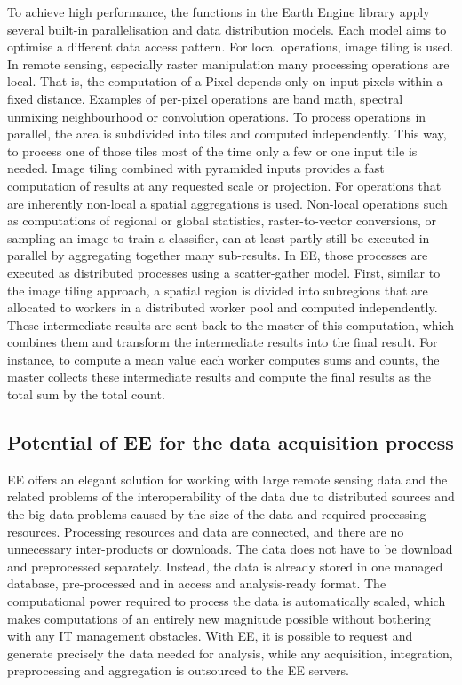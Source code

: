 To achieve high performance, the functions in the Earth Engine library apply several built-in parallelisation and data distribution models. Each model aims to optimise a different data access pattern.
For local operations, image tiling is used.
In remote sensing, especially raster manipulation many processing operations are local. That is, the computation of a Pixel depends only on input pixels within a fixed distance. Examples of per-pixel operations are band math, spectral unmixing neighbourhood or convolution operations. To process operations in parallel, the area is subdivided into tiles and computed independently. This way, to process one of those tiles most of the time only a few or one input tile is needed. Image tiling combined with pyramided inputs provides a fast computation of results at any requested scale or projection.
For operations that are inherently non-local a spatial aggregations is used.
Non-local operations such as computations of regional or global statistics, raster-to-vector conversions, or sampling an image to train a classifier, can at least partly still be executed in parallel by aggregating together many sub-results. In EE, those processes are executed as distributed processes using a scatter-gather model. First, similar to the image tiling approach, a spatial region is divided into subregions that are allocated to workers in a distributed worker pool and computed independently. These intermediate results are sent back to the master of this computation, which combines them and transform the intermediate results into the final result. For instance, to compute a mean value each worker computes sums and counts, the master collects these intermediate results and compute the final results as the total sum by the total count.

\subsection{Potential of EE for the data acquisition process}

EE offers an elegant solution for working with large remote sensing data and the related problems of the interoperability of the data due to distributed sources and the big data problems caused by the size of the data and required processing resources. 
Processing resources and data are connected, and there are no unnecessary inter-products or downloads. 
The data does not have to be download and preprocessed separately. Instead, the data is already stored in one managed database, pre-processed and in access and analysis-ready format. 
The computational power required to process the data is automatically scaled, which makes computations of an entirely new magnitude possible without bothering with any IT management obstacles.
With EE, it is possible to request and generate precisely the data needed for analysis, while any acquisition, integration, preprocessing and aggregation is outsourced to the EE servers. 

